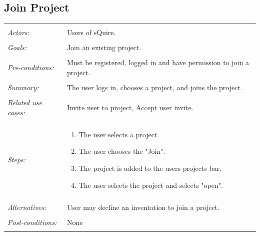 \documentclass[11pt]{report}
\begin{document}
\subsection{Join Project}
\begin{tabular}{ p{2cm} p{12cm} }
\hline
\\
\textit{Actors:} & Users of sQuire. \\ 
\\
\textit{Goals:} & Join an existing project.\\
\\
\textit{Pre-conditions:} & Must be registered, logged in and have permission to join a project.\\
\\
\textit{Summary:} & The user logs in, chooses a project, and joins the project. \\
\\
\textit{Related use cases:} & Invite user to project, Accept user invite. \\
\\
\textit{Steps:} & \begin{enumerate}
 \item The user selects a project.
 \item The user chooses the "Join". 
 \item The project is added to the users projects bar.
 \item The user selects the project and selects "open".
\end{enumerate}\\
\\
\textit{Alternatives:} & User may decline an inventation to join a project. \\
\\
\textit{Post-conditions:} & None \\
\\
\hline
\end{tabular}
\end{document}
